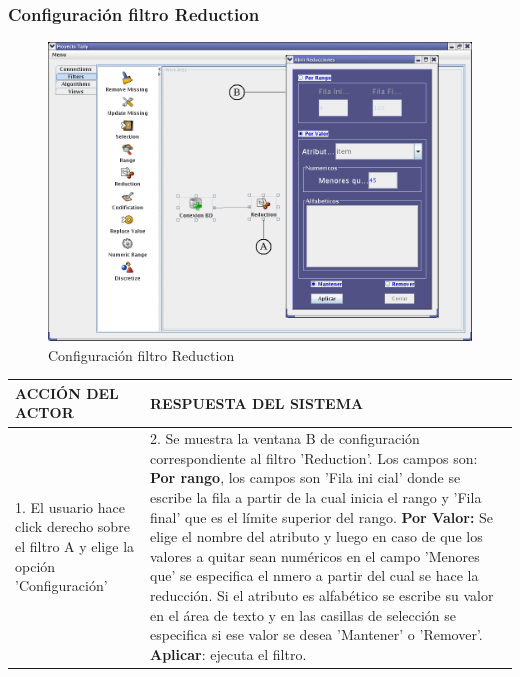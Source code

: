 \subsubsection{Configuraci\'on filtro Reduction}
\begin{figure}[ht]
\centering
\includegraphics[width=1\textwidth]{images/fi5.png}
\caption{Configuraci\'on filtro Reduction}
\end{figure}
\begin{center}
\begin{tabular}{|p{60mm}|p{60mm}|} \hline
ACCI\'ON DEL ACTOR & RESPUESTA DEL SISTEMA \\ \hline
1. El usuario hace click derecho sobre el filtro A y elige la opci\'on 'Configuraci\'on'& 2. Se muestra la ventana B de configuraci\'on correspondiente al filtro 'Reduction'. Los campos son: \textbf{Por rango}, los campos son 'Fila ini cial' donde se escribe la fila a partir de la cual inicia el rango y 'Fila final' que es el l\'imite superior del rango. \textbf{Por Valor:} Se elige el nombre del atributo y luego en caso de que los valores a quitar sean num\'ericos en el campo 'Menores que' se especifica el nmero a partir del cual se hace la reducci\'on. Si el atributo es alfab\'etico se escribe su valor en el \'area de texto y en las casillas de selecci\'on se especifica si ese valor se desea 'Mantener' o 'Remover'. \textbf{Aplicar}: ejecuta el filtro.  \\ \hline
\end{tabular}
\end{center}

